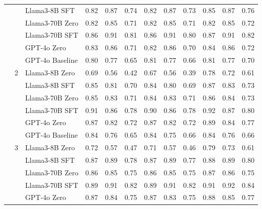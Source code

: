 \begin{longtable}[t]{ll>{}l|rr>{}r|rr>{}r|rrr}
 &  & Llama3-8B SFT & 0.82 & 0.87 & 0.74 & 0.82 & 0.87 & 0.73 & 0.85 & 0.87 & 0.76\\

 &  & Llama3-70B Zero & 0.82 & 0.85 & 0.71 & 0.82 & 0.85 & 0.71 & 0.82 & 0.85 & 0.72\\

 &  & Llama3-70B SFT & 0.86 & 0.91 & 0.81 & 0.86 & 0.91 & 0.80 & 0.87 & 0.91 & 0.82\\

 &  & GPT-4o Zero & 0.83 & 0.86 & 0.71 & 0.82 & 0.86 & 0.70 & 0.84 & 0.86 & 0.72\\

 &  & GPT-4o Baseline & 0.80 & 0.77 & 0.65 & 0.81 & 0.77 & 0.66 & 0.81 & 0.77 & 0.70\\
\cmidrule{2-12}
 & 2 & Llama3-8B Zero & 0.69 & 0.56 & 0.42 & 0.67 & 0.56 & 0.39 & 0.78 & 0.72 & 0.61\\

 &  & Llama3-8B SFT & 0.85 & 0.81 & 0.70 & 0.84 & 0.80 & 0.69 & 0.87 & 0.83 & 0.73\\

 &  & Llama3-70B Zero & 0.85 & 0.83 & 0.71 & 0.84 & 0.83 & 0.71 & 0.86 & 0.84 & 0.73\\

 &  & Llama3-70B SFT & 0.91 & 0.86 & 0.78 & 0.90 & 0.86 & 0.78 & 0.92 & 0.87 & 0.80\\

 &  & GPT-4o Zero & 0.87 & 0.82 & 0.72 & 0.87 & 0.82 & 0.72 & 0.89 & 0.84 & 0.77\\

 &  & GPT-4o Baseline & 0.84 & 0.76 & 0.65 & 0.84 & 0.75 & 0.66 & 0.84 & 0.76 & 0.66\\
\cmidrule{2-12}
 & 3 & Llama3-8B Zero & 0.72 & 0.57 & 0.47 & 0.71 & 0.57 & 0.46 & 0.79 & 0.73 & 0.61\\

 &  & Llama3-8B SFT & 0.87 & 0.89 & 0.78 & 0.87 & 0.89 & 0.77 & 0.88 & 0.89 & 0.80\\

 &  & Llama3-70B Zero & 0.86 & 0.85 & 0.75 & 0.86 & 0.85 & 0.75 & 0.87 & 0.86 & 0.75\\

 &  & Llama3-70B SFT & 0.89 & 0.91 & 0.82 & 0.89 & 0.91 & 0.82 & 0.91 & 0.92 & 0.84\\

 &  & GPT-4o Zero & 0.87 & 0.84 & 0.75 & 0.87 & 0.83 & 0.75 & 0.88 & 0.85 & 0.77\\


\end{longtable}
